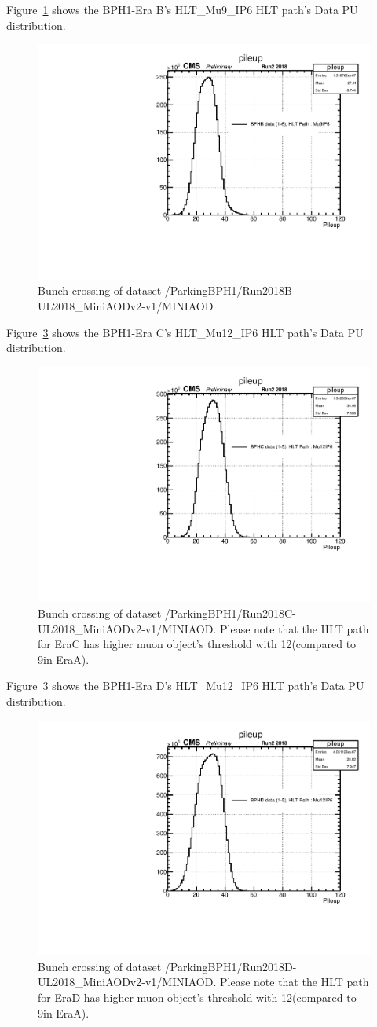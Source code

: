 Figure~\ref{fig:EraAData} shows the BPH1-Era B's HLT\_Mu9\_IP6 HLT path's Data PU distribution.
\begin{figure}[h!]
  \caption{Bunch crossing of dataset /ParkingBPH1/Run2018B-UL2018\_MiniAODv2-v1/MINIAOD}
  \label{fig:EraAData}
  \centering
  \includegraphics[width=0.67\linewidth]{figs/NVtx_BPHB.pdf}

\end{figure}

Figure~\ref{fig:EraCData} shows the BPH1-Era C's HLT\_Mu12\_IP6 HLT path's Data PU distribution.
\begin{figure}[h!]
\caption{Bunch crossing of dataset /ParkingBPH1/Run2018C-UL2018\_MiniAODv2-v1/MINIAOD. Please note that the HLT path for EraC has higher muon object's \pt threshold with 12\GeV (compared to 9\GeV in EraA).}
  \label{fig:EraCData}
  \centering
  \includegraphics[width=0.57\linewidth]{figs/NVtx_BPHC.pdf}

\end{figure}

Figure~\ref{fig:EraCData} shows the BPH1-Era D's HLT\_Mu12\_IP6 HLT path's Data PU distribution.
\begin{figure}[h!]
\caption{Bunch crossing of dataset /ParkingBPH1/Run2018D-UL2018\_MiniAODv2-v1/MINIAOD. Please note that the HLT path for EraD has higher muon object's \pt threshold with 12\GeV (compared to 9\GeV in EraA).}
  \label{fig:EraCData}
  \centering
  \includegraphics[width=0.57\linewidth]{figs/NVtx_BPHD.pdf}

\end{figure}


